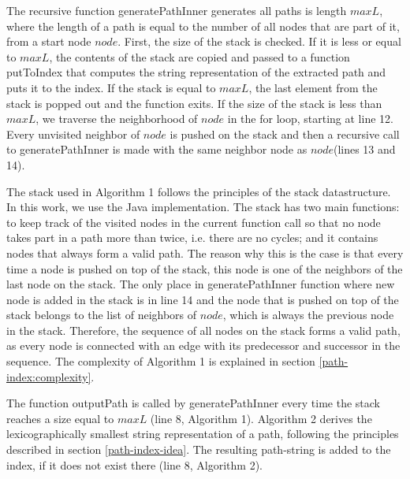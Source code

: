 \documentclass{l4proj}
\theoremstyle{definition}
\begin{document}
The recursive function \textrm{generatePathInner} generates all paths is length $maxL$, where the length of a path is equal to the number of all nodes that are part of it, from a start node $node$. First, the size of the stack is checked. If it is less or equal to $maxL$, the contents of the stack are copied and passed to a function \textrm{putToIndex} that computes the string representation of the extracted path and puts it to the index. If the stack is equal to $maxL$, the last element from the stack is popped out and the function exits. If the size of the stack is less than $maxL$, we traverse the neighborhood of $node$ in the for loop, starting at line 12. Every unvisited neighbor of $node$ is pushed on the stack and then a recursive call to \textrm{generatePathInner} is made with the same neighbor node as $node$(lines 13 and 14).\par
The stack used in \textrm{Algorithm 1} follows the principles of the stack datastructure. In this work, we use the Java implementation. The stack has two main functions: to keep track of the visited nodes in the current function call so that no node takes part in a path more than twice, i.e. there are no cycles; and it contains nodes that always form a valid path. The reason why this is the case is that every time a node is pushed on top of the stack, this node is one of the neighbors of the last node on the stack. The only place in generatePathInner function where new node is added in the stack is in line 14 and the node that is pushed on top of the stack belongs to the list of neighbors of $node$, which is always the previous node in the stack. Therefore, the sequence of all nodes on the stack forms a valid path, as every node is connected with an edge with its predecessor and successor in the sequence. The complexity of Algorithm 1 is explained in section \ref{path-index:complexity}.\par
The function \textrm{outputPath} is called by \textrm{generatePathInner} every time the stack reaches a size equal to $maxL$ (line 8, Algorithm 1). Algorithm 2 derives the lexicographically smallest string representation of a path, following the principles described in section \ref{path-index-idea}. The resulting path-string is added to the index, if it does not exist there (line 8, Algorithm 2). \par 
\end{document}
